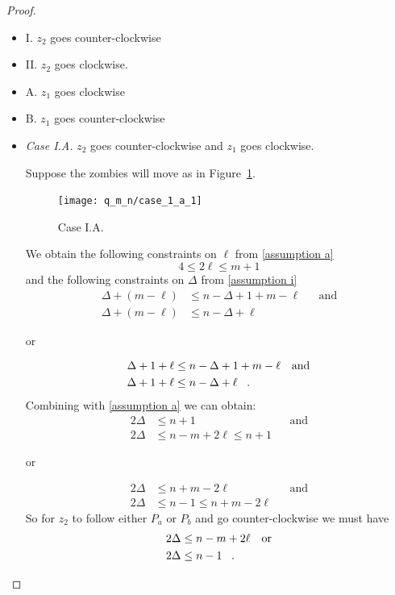 \begin{proof}
\begin{proofpart}
  \begin{itemize}
   \item I. $z_2$ goes counter-clockwise
   \item II. $z_2$ goes clockwise.
   \item A. $z_1$ goes clockwise
   \item B. $z_1$ goes counter-clockwise
  \end{itemize}

\begin{itemize}
  \item \textit{Case I.A.} $z_2$ goes counter-clockwise and $z_1$ goes clockwise.

  Suppose the zombies will move as in Figure~\ref{fig:case_1_a_1}.
  \begin{figure}
    \centering
    \texttt{[image: q\_m\_n/case\_1\_a\_1]}
    \caption{Case I.A. \label{fig:case_1_a_1}}
  \end{figure}

  We obtain the following constraints on $\ell$ from \ref{assumption a}
  \[ 4 \leq 2 \ell \leq m + 1 \]
  and the following constraints on $\Delta$ from \ref{assumption i}
  \begin{align*}
   \Delta + (m - \ell) &\leq n - \Delta + 1 + m - \ell && \text{and} \\
   \Delta + (m - \ell) &\leq n - \Delta + \ell
  \end{align*}
  \begin{center}or\end{center}
  \begin{align*}
   \Delta + 1 + \ell &\leq n - \Delta + 1 + m - \ell && \text{and} \\
   \Delta + 1 + \ell &\leq n - \Delta + \ell \mperiod
  \end{align*}
  Combining with \ref{assumption a} we can obtain:
  \begin{align*}
   2 \Delta &\leq n+1 && \text{and} \\
   2 \Delta &\leq n - m + 2\ell \leq n+1
  \end{align*}
  \begin{center}or\end{center}
  \begin{align*}
   2 \Delta &\leq n+m -2 \ell && \text{and} \\
   2 \Delta &\leq n -1 \leq n + m - 2\ell
  \end{align*}
  So for $z_2$ to follow either $P_a$ or $P_b$ and go counter-clockwise we must have
  \begin{align*}
   2 \Delta &\leq n - m + 2\ell && \text{or} \\
   2 \Delta &\leq n - 1 \mperiod
  \end{align*}


\end{itemize}
\end{proofpart}
\end{proof}
